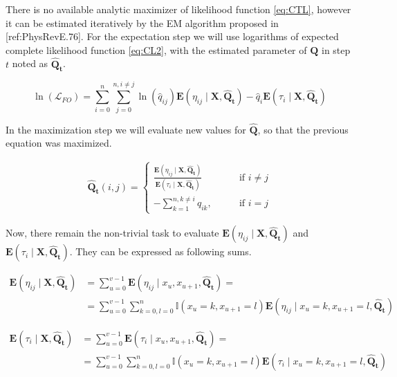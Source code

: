 \documentclass[thesis=M,english]{FITthesis}[2012/10/20]
\newcommand{\matr}[1]{\mathbf{#1}}
\begin{document}
There is no available analytic maximizer of likelihood function \eqref{eq:CTL}, however it can be estimated iteratively by the EM algorithm proposed in [ref:PhysRevE.76].  
For the expectation step we will use logarithms of expected complete likelihood function \eqref{eq:CL2}, with the estimated parameter of $\matr{Q}$ in step $t$ noted as $\matr{ \hat Q_t } $.

\begin{equation}\label{eq:EMCL}
 \ln( \mathcal{L}_{FO} ) = \sum_{i=0}^n \sum_{j=0}^{n, i \neq j} \ln( \hat q_{ij}) \mathbf{E}( \eta_{ij} \mid \matr{X}, \matr{ \hat Q_t } ) - \hat q_i \mathbf{E}( \tau_i \mid \matr{X}, \matr{ \hat Q_t } )
\end{equation}

In the maximization step we will evaluate new values for $\matr{ \hat Q }$, so that the previous equation was maximized. 

\begin{equation}
\begin{aligned}  
\matr{ \hat Q_t }(i,j)= 
\begin{cases}
\frac{ \mathbf{E}(\eta_{ij} \mid \matr{X}, \matr{ \hat Q_t } )}{ \mathbf{E}( \tau_i \mid \matr{X}, \matr{\hat Q_t} ) } & \text{if } i\neq j\\
- \sum\limits_{k=1}^{n,k \neq i} q_{ik}, \qquad & \text{if } i=j
\end{cases}
\end{aligned}
\end{equation}

Now, there remain the non-trivial task to evaluate $\mathbf{E}( \eta_{ij} \mid \matr{X}, \matr{\hat Q_t} )$ and $\mathbf{E}( \tau_i \mid \matr{X}, \matr{ \hat Q_t } )$. They can be expressed as following sums.


\begin{equation}
\begin{aligned}  
\mathbf{E}(\eta_{ij} \mid \matr{X}, \matr{\hat Q_t} ) &= \sum_{u=0}^{v-1} \mathbf{E}(\eta_{ij} \mid x_u, x_{u+1}, \matr{ \hat Q_t } ) = \\
&= \sum_{u=0}^{v-1} \sum_{k=0,l=0}^{n} \mathbb{I}( x_u = k, x_{u+1} = l ) \mathbf{E}(\eta_{ij} \mid x_u = k, x_{u+1} = l, \matr{\hat Q_t} )
\end{aligned}
\end{equation}


\begin{equation}
\begin{aligned}  
\mathbf{E}( \tau_i \mid \matr{X}, \matr{\hat Q_t} ) &= \sum_{u=0}^{v-1} \mathbf{E}(\tau_i \mid x_u, x_{u+1}, \matr{ \hat Q_t } ) = \\
&= \sum_{u=0}^{v-1} \sum_{k=0,l=0}^{n} \mathbb{I}( x_u = k, x_{u+1} = l ) \mathbf{E}(\tau_i \mid x_u = k, x_{u+1} = l, \matr{\hat Q_t} )
\end{aligned}
\end{equation}
   
\end{document}
